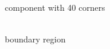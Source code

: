 \documentclass[12pt,a4paper,oneside,openright]{book}
\begin{document}
\begin{CJK}{UTF8}{}
\begin{figure}[htbp]
\begin{center}
    \begin{minipage}[t]{.32\textwidth}
      \begin{center}
        \\
        component with 40 corners
      \end{center}
    \end{minipage}
    \begin{minipage}[t]{.32\textwidth}
      \begin{center}
        \\
        boundary region
      \end{center}

\end{minipage}
\end{center}
\end{figure}
\end{CJK}
\end{document}
